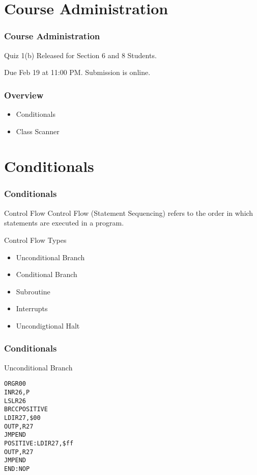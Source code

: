 \documentclass[10pt, compress]{beamer}
\begin{document}
\prepareCover


\section{Course Administration}

\begin{frame}[fragile]
\frametitle{Course Administration}
  Quiz 1(b) Released for Section 6 and 8 Students.

  Due Feb 19 at 11:00 PM. Submission is online.
\end{frame}

\begin{frame}[fragile]
  \frametitle{Overview}
  \begin{itemize}
    \item[] Conditionals
    \item[] Class Scanner
  \end{itemize}
\end{frame}

\section{Conditionals}

\begin{frame}[fragile]
  \frametitle{Conditionals}
  \begin{block}{Control Flow}
    Control Flow (Statement Sequencing) refers to the order in which statements are executed in a program.
  \end{block}
  \begin{block}{Control Flow Types}
    \begin{itemize}
      \item[] Unconditional Branch
      \item[] Conditional Branch
      \item[] Subroutine
      \item[] Interrupts
      \item[] Uncondigtional Halt
    \end{itemize}
  \end{block}
\end{frame}

\begin{frame}[fragile]
  \frametitle{Conditionals}
  \begin{block}{Unconditional Branch}
    \begin{alltt}
            ORG     R00
            IN      R26, P
            LSL     R26
            \alert{BRCC}    POSITIVE
            LDI     R27, \$00
            OUT     P, R27
            JMP     END
POSITIVE:   LDI     R27, \$ff
            OUT     P, R27
            JMP     END
END:        NOP
    \end{alltt}
  \end{block}
\end{frame}
\end{document}
